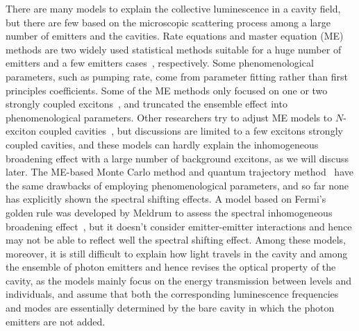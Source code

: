 

There are many models to explain the collective luminescence in a cavity field, but there are few based on the microscopic scattering process among a large number of emitters and the cavities. Rate equations and master equation (ME) methods are two widely used statistical methods suitable for a huge number of emitters and a few emitters cases~\cite{Hughes2009, Hughes2007, Xu2000, Averkiev2009}, respectively. Some phenomenological parameters, such as pumping rate, come from parameter fitting rather than first principles coefficients. Some of the ME methods only focused on one or two strongly coupled excitons~\cite{Laussy2006, Reboul2009, Schwab2006, Illes2010a}, and truncated the ensemble effect into phenomenological parameters. Other researchers try to adjust ME models to $N$-exciton coupled cavities~\cite{Illes2010a,Laussy2011}, but discussions are limited to a few excitons strongly coupled cavities, and these models can hardly explain the inhomogeneous broadening effect with a large number of background excitons, as we will discuss later. The ME-based Monte Carlo method and quantum trajectory method~\cite{Nowak2008,Meldrum2009,Temnov2005} have the same drawbacks of employing phenomenological parameters, and so far none has explicitly shown the spectral shifting effects.  A model based on Fermi's golden rule was developed by Meldrum to assess the spectral inhomogeneous broadening effect~\cite{Meldrum2010}, but it doesn't consider emitter-emitter interactions and hence may not be able to reflect well the spectral shifting effect. Among these models, moreover, it is still difficult to explain how light travels in the cavity and among the ensemble of photon emitters and hence revises the optical property of the cavity, as the models mainly focus on the energy transmission between levels and individuals, and assume that both the corresponding luminescence frequencies and modes are essentially determined by the bare cavity in which the photon emitters are not added.

